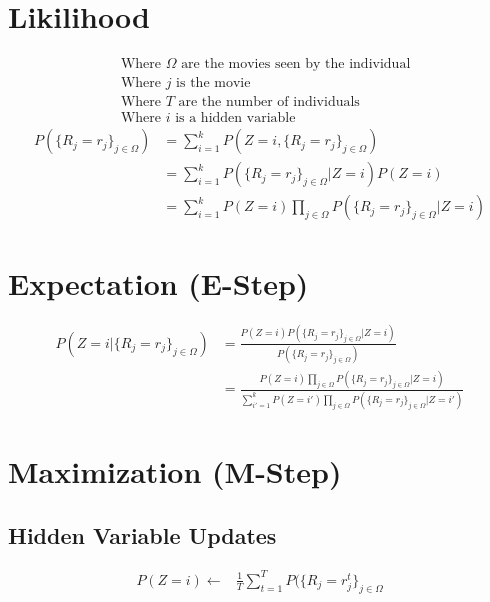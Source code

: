 \documentclass{article}
\begin{document}
	
\section{Likilihood}
\begin{align*}
&\text{Where } \Omega \text{ are the movies seen by the individual}\\
&\text{Where } j \text{ is the movie}\\
&\text{Where } T \text{ are the number of individuals}\\
&\text{Where } i \text{ is a hidden variable}
\end{align*}
\begin{align*}
P(\{R_j=r_j\}_{j\in \Omega }) & = \sum_{i=1}^k P(Z=i, {\{R_j=r_j\}_{j\in \Omega }}) \\
& = \sum_{i=1}^k P({\{R_j=r_j\}_{j\in \Omega }} | Z=i) P(Z=i) \\
& = \sum_{i=1}^k P(Z=i) \prod_{j\in \Omega } P({\{R_j=r_j\}_{j\in \Omega }} | Z=i) 
\end{align*}
\section{Expectation (E-Step)}
\begin{align*}
P(Z=i | {\{R_j=r_j\}_{j\in \Omega }}) &= \frac{P(Z=i)  P({\{R_j=r_j\}_{j\in \Omega }} | Z=i)}{P(\{R_j=r_j\}_{j\in \Omega })} \\
&=\frac{P(Z=i) \prod_{j\in \Omega } P({\{R_j=r_j\}_{j\in \Omega }} | Z=i)}{\sum_{i'=1}^k P(Z=i') \prod_{j\in \Omega } P({\{R_j=r_j\}_{j\in \Omega }} | Z=i')  }
\end{align*}
\section{Maximization (M-Step)}
\subsection{Hidden Variable Updates}
\begin{align*}
	P(Z=i) \leftarrow&  \frac{1}{T} \sum_{t=1}^{T} P(\{R_j=r_j^t\}_{j\in \Omega} \\
\end{align*}
\end{document}
